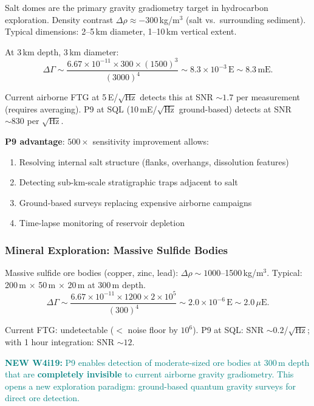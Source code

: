 \documentclass[11pt]{article}
\theoremstyle{definition}
\theoremstyle{remark}
\newcommand{\ee}[1]{\times10^{#1}}
\newcommand{\newfinding}[1]{\textcolor{teal}{\textbf{NEW W4i19:} #1}}
\begin{document}
Salt domes are the primary gravity gradiometry target in hydrocarbon
exploration. Density contrast $\Delta\rho \approx -300$\,kg/m$^3$ (salt
vs.\ surrounding sediment). Typical dimensions: 2--5\,km diameter,
1--10\,km vertical extent.

At 3\,km depth, 3\,km diameter:
\begin{equation}
  \Delta\Gamma \sim \frac{6.67\ee{-11} \times 300 \times (1500)^3}{(3000)^4}
  \sim 8.3\ee{-3}\,\text{E} \sim 8.3\,\text{mE}.
\end{equation}

Current airborne FTG at 5\,E/$\sqrt{\text{Hz}}$ detects this at SNR $\sim 1.7$
per measurement (requires averaging). P9 at SQL (10\,mE/$\sqrt{\text{Hz}}$
ground-based) detects at SNR $\sim 830$ per $\sqrt{\text{Hz}}$.

\textbf{P9 advantage}: $500\times$ sensitivity improvement allows:
\begin{enumerate}
  \item Resolving internal salt structure (flanks, overhangs, dissolution features)
  \item Detecting sub-km-scale stratigraphic traps adjacent to salt
  \item Ground-based surveys replacing expensive airborne campaigns
  \item Time-lapse monitoring of reservoir depletion
\end{enumerate}

\subsubsection{Mineral Exploration: Massive Sulfide Bodies}

Massive sulfide ore bodies (copper, zinc, lead): $\Delta\rho \sim 1000$--1500\,kg/m$^3$.
Typical: 200\,m $\times$ 50\,m $\times$ 20\,m at 300\,m depth.
\begin{equation}
  \Delta\Gamma \sim \frac{6.67\ee{-11} \times 1200 \times 2\ee{5}}{(300)^4}
  \sim 2.0\ee{-6}\,\text{E} \sim 2.0\,\mu\text{E}.
\end{equation}

Current FTG: undetectable ($<$ noise floor by $10^6$). P9 at SQL:
SNR $\sim 0.2$/$\sqrt{\text{Hz}}$; with 1 hour integration: SNR $\sim 12$.

\newfinding{P9 enables detection of moderate-sized ore bodies at 300\,m
depth that are \textbf{completely invisible} to current airborne gravity
gradiometry. This opens a new exploration paradigm: ground-based quantum
gravity surveys for direct ore detection.}
\end{document}
